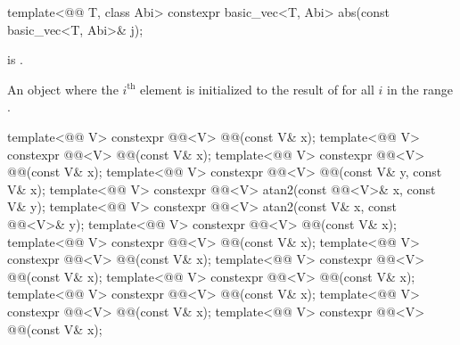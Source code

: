 \begin{itemdecl}
template<@@ T, class Abi>
  constexpr basic_vec<T, Abi> abs(const basic_vec<T, Abi>& j);
\end{itemdecl}

\begin{itemdescr}
\pnum
\expects
{} is .

\pnum
\returns
An object where the $i^{\textrm{th}}$ element is initialized to the result of
 for all $i$ in the range .

\end{itemdescr}

\begin{itemdecl}
template<@@ V> constexpr @@<V> @@(const V& x);
template<@@ V> constexpr @@<V> @@(const V& x);
template<@@ V> constexpr @@<V> @@(const V& x);
template<@@ V>
  constexpr @@<V> @@(const V& y, const V& x);
template<@@ V>
  constexpr @@<V> atan2(const @@<V>& x, const V& y);
template<@@ V>
  constexpr @@<V> atan2(const V& x, const @@<V>& y);
template<@@ V> constexpr @@<V> @@(const V& x);
template<@@ V> constexpr @@<V> @@(const V& x);
template<@@ V> constexpr @@<V> @@(const V& x);
template<@@ V> constexpr @@<V> @@(const V& x);
template<@@ V> constexpr @@<V> @@(const V& x);
template<@@ V> constexpr @@<V> @@(const V& x);
template<@@ V> constexpr @@<V> @@(const V& x);
template<@@ V> constexpr @@<V> @@(const V& x);

\end{itemdecl}
